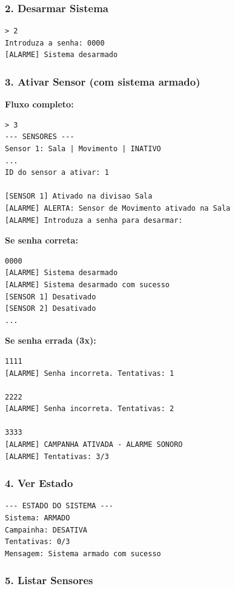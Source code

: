 \documentclass[12pt,a4paper]{article}
\begin{document}
\subsubsection*{2. Desarmar Sistema}

\begin{verbatim}
> 2
Introduza a senha: 0000
[ALARME] Sistema desarmado
\end{verbatim}

\subsubsection*{3. Ativar Sensor (com sistema armado)}

\textbf{Fluxo completo:}

\begin{verbatim}
> 3
--- SENSORES ---
Sensor 1: Sala | Movimento | INATIVO
...
ID do sensor a ativar: 1

[SENSOR 1] Ativado na divisao Sala
[ALARME] ALERTA: Sensor de Movimento ativado na Sala
[ALARME] Introduza a senha para desarmar: 
\end{verbatim}

\textbf{Se senha correta:}
\begin{verbatim}
0000
[ALARME] Sistema desarmado
[ALARME] Sistema desarmado com sucesso
[SENSOR 1] Desativado
[SENSOR 2] Desativado
...
\end{verbatim}

\textbf{Se senha errada (3x):}
\begin{verbatim}
1111
[ALARME] Senha incorreta. Tentativas: 1

2222
[ALARME] Senha incorreta. Tentativas: 2

3333
[ALARME] CAMPANHA ATIVADA - ALARME SONORO
[ALARME] Tentativas: 3/3
\end{verbatim}

\subsubsection*{4. Ver Estado}

\begin{verbatim}
--- ESTADO DO SISTEMA ---
Sistema: ARMADO
Campainha: DESATIVA
Tentativas: 0/3
Mensagem: Sistema armado com sucesso
\end{verbatim}

\subsubsection*{5. Listar Sensores}
\end{document}
